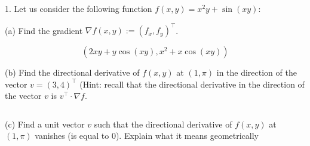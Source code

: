 1. Let us consider the following function $f (x, y) = x^2y + \sin(xy)$:

(a) Find the gradient $\nabla f (x, y) := (f_x, f_y )^\top $.

$$(2xy+y\cos(xy),x^2+x\cos(xy))$$

(b) Find the directional derivative of $f (x, y)$ at $(1, \pi)$ in the direction of the vector $v = (3, 4)^\top$ (Hint: recall that the directional derivative in the direction of the vector $v$ is $v^\top \cdot\nabla f$.

$$$$

(c) Find a unit vector $v$ such that the directional derivative of $f (x, y)$ at $(1, \pi)$ vanishes (is equal to 0). Explain what it means geometrically
    
$$$$
